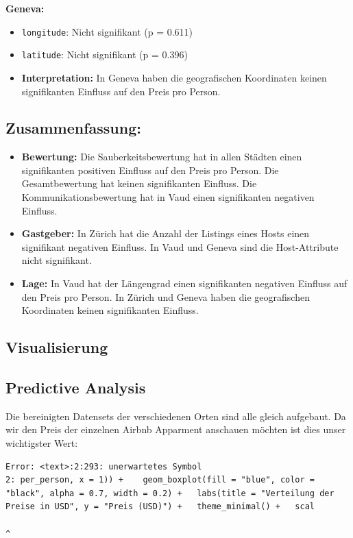 \documentclass[
  journal,
]{IEEEtran}%
\providecommand{\tightlist}{%
  \setlength{\itemsep}{0pt}\setlength{\parskip}{0pt}}\usepackage{longtable,booktabs,array}
\begin{document}
\textbf{Geneva:}

\begin{itemize}
\item
  \texttt{longitude}: Nicht signifikant (p = 0.611)
\item
  \texttt{latitude}: Nicht signifikant (p = 0.396)
\item
  \textbf{Interpretation:} In Geneva haben die geografischen Koordinaten
  keinen signifikanten Einfluss auf den Preis pro Person.
\end{itemize}

\subsection{Zusammenfassung:}\label{zusammenfassung}

\begin{itemize}
\tightlist
\item
  \textbf{Bewertung:} Die Sauberkeitsbewertung hat in allen Städten
  einen signifikanten positiven Einfluss auf den Preis pro Person. Die
  Gesamtbewertung hat keinen signifikanten Einfluss. Die
  Kommunikationsbewertung hat in Vaud einen signifikanten negativen
  Einfluss.
\item
  \textbf{Gastgeber:} In Zürich hat die Anzahl der Listings eines Hosts
  einen signifikant negativen Einfluss. In Vaud und Geneva sind die
  Host-Attribute nicht signifikant.
\item
  \textbf{Lage:} In Vaud hat der Längengrad einen signifikanten
  negativen Einfluss auf den Preis pro Person. In Zürich und Geneva
  haben die geografischen Koordinaten keinen signifikanten Einfluss.
\end{itemize}

\subsection{\texorpdfstring{\textbf{Visualisierung}}{Visualisierung}}\label{visualisierung-1}

\subsection{Predictive Analysis}\label{predictive-analysis-1}

Die bereinigten Datensets der verschiedenen Orten sind alle gleich
aufgebaut. Da wir den Preis der einzelnen Airbnb Apparment anschauen
möchten ist dies unser wichtigster Wert:

\begin{verbatim}
Error: <text>:2:293: unerwartetes Symbol
2: per_person, x = 1)) +    geom_boxplot(fill = "blue", color = "black", alpha = 0.7, width = 0.2) +   labs(title = "Verteilung der Preise in USD", y = "Preis (USD)") +   theme_minimal() +   scal
                                                                                                                                                                                                                                                                                                        ^
\end{verbatim}
\end{document}
